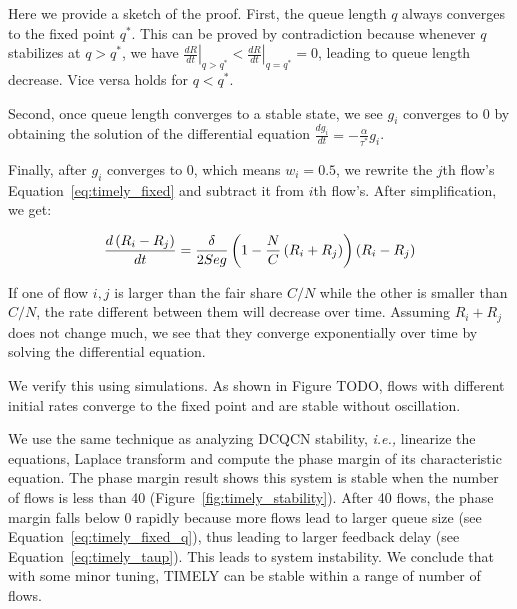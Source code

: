 Here we provide a sketch of the proof. First, the queue length $q$ always
converges to the fixed point $q^*$. This can be proved by contradiction because whenever $q$ stabilizes
at $q>q^*$, we have ${\left. {\frac{{dR}}{{dt}}} \right|_{q > {q^*}}} < {\left. {\frac{{dR}}{{dt}}} \right|_{q = {q^*}}} = 0$, 
leading to queue length decrease. Vice versa holds for $q<q^*$. 

Second, once queue length converges to a stable state, we see $g_i$ converges to 0 by obtaining
the solution of the differential equation $\frac{{d{g_i}}}{{dt}} =  - \frac{\alpha }{{{\tau ^*}}}{g_i}$.

Finally, after $g_i$ converges to 0, which means $w_i=0.5$, we rewrite the $j$th flow's Equation~\ref{eq:timely_fixed} 
and subtract it from $i$th flow's. After simplification, we get:

\begin{equation}
\small
\frac{{d\left( {{R_i} - {R_j}} \right)}}{{dt}} = \frac{\delta }{{2Seg}}\left( {1 - \frac{N}{C}\left( {{R_i} + {R_j}} \right)} \right)\left( {{R_i} - {R_j}} \right)
\end{equation}

If one of flow ${i,j}$ is larger than the fair share $C/N$ while the other is smaller than $C/N$,
the rate different between them will decrease over time. Assuming ${{R_i} + {R_j}}$ does not change
much, we see that they converge exponentially over time by solving the differential equation.

We verify this using simulations. As shown in Figure TODO, flows with different initial rates converge 
to the fixed point and are stable without oscillation. 

 We use the same technique as analyzing
DCQCN stability, {\em i.e.,} linearize the equations, Laplace transform and compute the phase margin 
of its characteristic equation. The phase margin result shows this system is stable when the number of 
flows is less than 40 (Figure~\ref{fig:timely_stability}). After 40 flows, the phase margin falls below 
0 rapidly because more flows lead to larger queue size (see Equation~\ref{eq:timely_fixed_q}), 
thus leading to larger feedback delay (see Equation~\ref{eq:timely_taup}). 
This leads to system instability. We conclude that with some minor tuning, TIMELY can be stable 
within a range of number of flows.